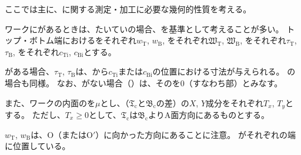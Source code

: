

ここでは主に、\textbf{\Outcut}に関する測定・加工に必要な幾何的性質を考える。

ワークに\textbf{\Outcut}があるときは、たいていの場合、\textbf{\OutcutAsideThickness}を基準として考えることが多い。
\expandafterindex{\yomiEndFaceID@\nameEndFaceID}トップ・ボトム端における\textbf{\nameInnerDiameter}をそれぞれ$w_\mathrm T$, $w_\mathrm B$, \textbf{\OutcutWidth}をそれぞれ$\mathfrak W_\mathrm T$, $\mathfrak W_\mathrm B$, \textbf{\OutcutAsideThickness}をそれぞれ$\tau_\mathrm T$, $\tau_\mathrm B$, \textbf{\EndFaceInCChamferLength}をそれぞれ$c_\mathrm{Ti}$, $c_\mathrm{Bi}$とする。
\begin{hosoku}
\EndFaceInCChamfer がある場合、\OutcutAsideThickness$\tau_\mathrm T$, $\tau_\mathrm B$は、\EndFace から\EndFaceInCChamferLength$c_\mathrm{Ti}$または$c_\mathrm{Bi}$の位置における寸法が与えられる。
\EndFaceInRChamferRadius の場合も同様。
なお、\EndFaceChamfer がない場合（）は、その\EndFaceChamferLength を0（すなわち\EndFace 部）とみなす。
\end{hosoku}
また、ワークの内面の\textbf{\PlatingThk}を$\mu$とし、\textbf{\CenterlineEndFaceDif}（\TopOutcutCenter$\mathfrak T_\mathrm c$と\BottomOutcutCenter$\mathfrak B_\mathrm c$の差）の$X$, $Y$成分をそれぞれ$T_x$, $T_y$とする。
ただし、$T_x \geq 0$として、\TopOutcutCenter$\mathfrak T_\mathrm c$は\BottomOutcutCenter$\mathfrak B_\mathrm c$よりA面方向にあるものとする。
\begin{hosoku}
\InnerDiameter$w_\mathrm T$, $w_\mathrm B$は、\CurvatureCenter O（またはO$'$）に向かった方向にあることに注意。
\IDCenter がそれぞれの端に位置している。
\end{hosoku}



